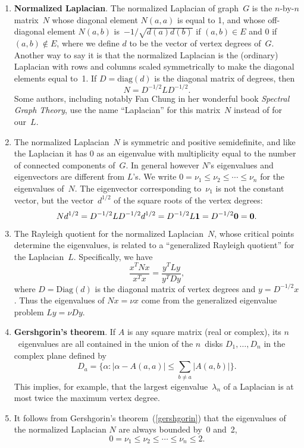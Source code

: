 \documentclass[11pt]{article}
\newcommand{\m}[1]{{\bf{#1}}}       %
\newcommand{\ones}{\m1}             %
\newcommand{\zeros}{\m0}            %
\newcommand{\diag}{\mbox{diag}}
\newcommand{\Diag}{\mbox{Diag}}
\begin{document}
\begin{enumerate}
\item\label{nlap}{\bf Normalized Laplacian}.
The normalized Laplacian of graph~$G$ is 
the $n$-by-$n$ matrix~$N$
whose diagonal element $N(a,a)$ is equal to 1,
and whose off-diagonal element $N(a,b)$ 
is~$-1/\sqrt{d(a)d(b)}$ if $(a,b) \in E$ and $0$ if $(a,b) \notin E$,
where we define $d$ to be the vector of vertex degrees of~$G$.
Another way to say it is that the normalized Laplacian is 
the (ordinary) Laplacian with rows and columns scaled symmetrically 
to make the diagonal elements equal to~1. 
If $D=\diag(d)$ is the diagonal matrix of degrees, 
then 
$$N = D^{-1/2}LD^{-1/2}.$$
Some authors, including notably Fan Chung in her 
wonderful book {\em Spectral Graph Theory}, 
use the name ``Laplacian'' for this matrix~$N$
instead of for our~$L$.

\item\label{nlapeig}
The normalized Laplacian~$N$ is symmetric and 
positive semidefinite, and like the Laplacian
it has 0 as an eigenvalue with multiplicity
equal to the number of connected components
of~$G$.  In general however $N$'s eigenvalues
and eigenvectors are different from $L$'s.
We write $0=\nu_1\le\nu_2\le\cdots\le\nu_n$
for the eigenvalues of~$N$.
The eigenvector corresponding to~$\nu_1$ is
not the constant vector, but the vector~$d^{1/2}$
of the square roots of the vertex degrees:
$$Nd^{1/2} = D^{-1/2}LD^{-1/2}d^{1/2} = D^{-1/2}L\ones = D^{-1/2}\zeros = \zeros.$$

\item\label{nlaprq}
The Rayleigh quotient for the normalized Laplacian~$N$, 
whose critical points determine the eigenvalues,
is related to a ``generalized Rayleigh quotient'' for the Laplacian~$L$.
Specifically, we have
$$\frac{x^TNx}{x^Tx} = \frac{y^TLy}{y^TDy},$$
where $D=\Diag(d)$ is the diagonal matrix of vertex degrees 
and $y=D^{-1/2}x$.
Thus the eigenvalues of $Nx=\nu x$ come from
the generalized eigenvalue problem $Ly=\nu Dy.$

\item\label{gershgorin}{\bf Gershgorin's theorem}.
If $A$ is any square matrix (real or complex), its $n$~eigenvalues are all contained
in the union of the $n$~disks $D_1,\ldots,D_n$ in the complex plane defined by
$$D_a = \{\alpha : |\alpha-A(a,a)| \leq \sum_{b\neq a}|A(a,b)|\}.$$
This implies, for example, that the largest eigenvalue~$\lambda_n$ of a Laplacian
is at most twice the maximum vertex degree.

\item
It follows from Gershgorin's theorem~(\ref{gershgorin}) that
the eigenvalues of the normalized Laplacian $N$ are always bounded by~0 and~2,
$$0 = \nu_1 \leq \nu_2 \leq \cdots \leq \nu_n \leq 2.$$


\end{enumerate}
\end{document}
